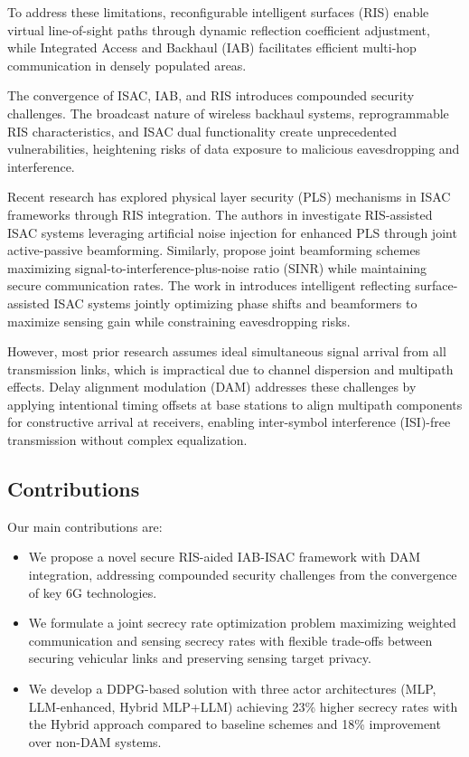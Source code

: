 \documentclass[conference]{IEEEtran}
\begin{document}
To address these limitations, reconfigurable intelligent surfaces (RIS) enable virtual line-of-sight paths through dynamic reflection coefficient adjustment, while Integrated Access and Backhaul (IAB) facilitates efficient multi-hop communication in densely populated areas.

The convergence of ISAC, IAB, and RIS introduces compounded security challenges. The broadcast nature of wireless backhaul systems, reprogrammable RIS characteristics, and ISAC dual functionality create unprecedented vulnerabilities, heightening risks of data exposure to malicious eavesdropping and interference.

Recent research has explored physical layer security (PLS) mechanisms in ISAC frameworks through RIS integration. The authors in \cite{Sun2024} investigate RIS-assisted ISAC systems leveraging artificial noise injection for enhanced PLS through joint active-passive beamforming. Similarly, \cite{Ye2025} propose joint beamforming schemes maximizing signal-to-interference-plus-noise ratio (SINR) while maintaining secure communication rates. The work in \cite{Hua2024} introduces intelligent reflecting surface-assisted ISAC systems jointly optimizing phase shifts and beamformers to maximize sensing gain while constraining eavesdropping risks.

However, most prior research assumes ideal simultaneous signal arrival from all transmission links, which is impractical due to channel dispersion and multipath effects. Delay alignment modulation (DAM) addresses these challenges by applying intentional timing offsets at base stations to align multipath components for constructive arrival at receivers, enabling inter-symbol interference (ISI)-free transmission without complex equalization.

\subsection{Contributions}

Our main contributions are:
\begin{itemize}
    \item We propose a novel secure RIS-aided IAB-ISAC framework with DAM integration, addressing compounded security challenges from the convergence of key 6G technologies.
    \item We formulate a joint secrecy rate optimization problem maximizing weighted communication and sensing secrecy rates with flexible trade-offs between securing vehicular links and preserving sensing target privacy.
    \item We develop a DDPG-based solution with three actor architectures (MLP, LLM-enhanced, Hybrid MLP+LLM) achieving 23\% higher secrecy rates with the Hybrid approach compared to baseline schemes and 18\% improvement over non-DAM systems.
\end{itemize}
\end{document}
